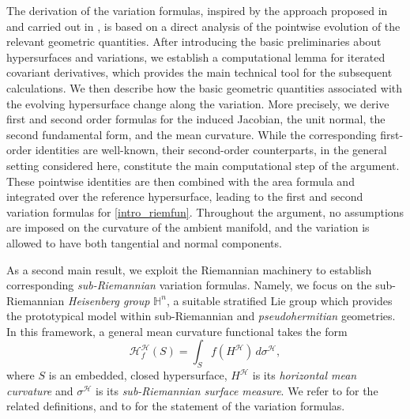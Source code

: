 \documentclass[11pt]{amsart}
\newcommand{\hhh}{{\mathcal{H}}}
\newcommand{\tmc}{{\mathscr{H}}}
\theoremstyle{definition}
\theoremstyle{remark}
\numberwithin{equation}{section}
\begin{document}
\medskip
The derivation of the variation formulas, inspired by the approach proposed in \cite{MR4676392} and carried out in , is based on a direct analysis of the pointwise evolution of the relevant geometric quantities. After introducing the basic preliminaries about hypersurfaces and variations, we establish a computational lemma for iterated covariant derivatives, which provides the main technical tool for the subsequent calculations. We then describe how the basic geometric quantities associated with the evolving hypersurface change along the variation. More precisely, we derive first and second order formulas for the induced Jacobian, the unit normal, the second fundamental form, and the mean curvature. While the corresponding first-order identities are well-known, their second-order counterparts, in the general setting considered here, constitute the main computational step of the argument. These pointwise identities are then combined with the area formula and integrated over the reference hypersurface, leading to the first and second variation formulas for \eqref{intro_riemfun}. Throughout the argument, no assumptions are imposed on the curvature of the ambient manifold, and the variation is allowed to have both tangential and normal components.

\medskip
As a second main result, we exploit the Riemannian machinery to establish corresponding \emph{sub-Riemannian} variation formulas. Namely, we focus on the sub-Riemannian  \emph{Heisenberg group} $\mathbb H^n$, a suitable stratified Lie group which provides the prototypical model within sub-Riemannian \cite{MR3971262,MR2363343} and \emph{pseudohermitian} \cite{MR2165405} geometries. In this framework, a general mean curvature functional takes the form 
\begin{equation}\label{tmcfunsubriemderfgt5ryhythyh}
    \tmc^\hhh_f(S)=\int_S f\left(H^\hhh\right)\,d\sigma^\hhh,
\end{equation} 
where $S$ is an embedded, closed hypersurface, $H^\hhh$ is its \emph{horizontal mean curvature} and $\sigma^\hhh$ is its \emph{sub-Riemannian surface measure}. We refer to  for the related definitions, and to  for the statement of the variation formulas.
\end{document}
